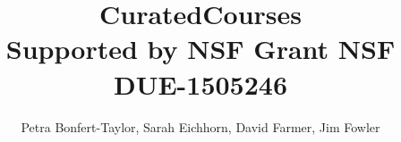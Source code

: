 \documentclass[final]{beamer}
\title{\textsf{CuratedCourses} \\
\vspace{54pt}\large\textsf{\textmd{Supported by NSF Grant NSF DUE-1505246}}}
\author{\large\textsf{Petra Bonfert-Taylor, Sarah Eichhorn, David Farmer, Jim Fowler}}
\begin{document}
{

\newenvironment{sectionblock}[1]{\begin{block}{\rule{0pt}{1in}#1}}{\end{block}}


\begin{frame}[fragile]{}
  \begin{columns}[t]

    \begin{column}{0.32\linewidth}
      
    \end{column}%

    \begin{column}{0.32\linewidth}
      
    \end{column}%

    \begin{column}{0.32\linewidth}
      
    \end{column}
 
  \end{columns}
\end{frame}
}
\end{document}
